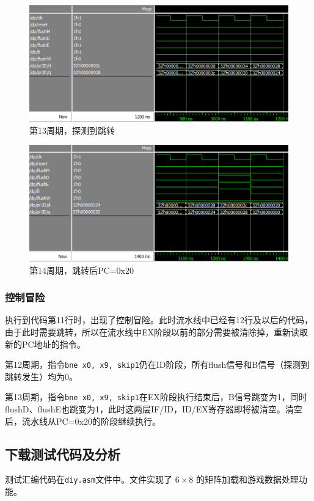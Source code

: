 \documentclass[UTF8,a4paper,autofakebold,15pt]{ctexart}
\begin{document}
\begin{figure}
	\centering
	\includegraphics[scale=.8]{fig13.png}
	\caption{第13周期，探测到跳转}
	\label{fig:label13}
\end{figure}

\begin{figure}
	\centering
	\includegraphics[scale=.8]{fig14.png}
	\caption{第14周期，跳转后PC=0x20}
	\label{fig:label14}
\end{figure}

\subsubsection{控制冒险}

执行到代码第11行时，出现了控制冒险。此时流水线中已经有12行及以后的代码，由于此时需要跳转，所以在流水线中EX阶段以前的部分需要被清除掉，重新读取新的PC地址的指令。

第12周期，指令{\tt bne x0, x9, skip1}仍在ID阶段，所有flush信号和B信号（探测到跳转发生）均为0。



第13周期，指令{\tt bne x0, x9, skip1}在EX阶段执行结束后，B信号跳变为1，同时flushD、flushE也跳变为1，此时这两层IF/ID，ID/EX寄存器即将被清空。清空后，流水线从PC=0x20的阶段继续执行。



\subsection{下载测试代码及分析}
	测试汇编代码在{\tt diy.asm}文件中。文件实现了 $6\times 8$ 的矩阵加载和游戏数据处理功能。
	
\end{document}

